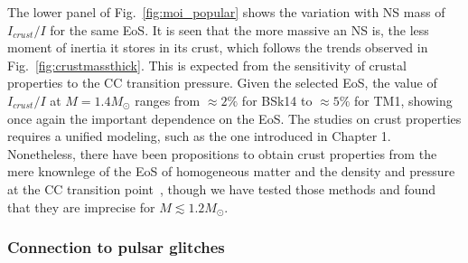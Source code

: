 The lower panel of Fig.~\ref{fig:moi_popular} shows the variation with NS mass
of $I_{crust}/I$ for the same EoS. It is seen that the more massive an 
NS is, the less moment of inertia it stores in its crust, which follows
the trends observed in Fig.~\ref{fig:crustmassthick}. This is expected from 
the sensitivity of crustal properties to the CC transition pressure. Given the 
selected EoS, the value of $I_{crust}/I$ at $M=1.4M_\odot$ 
ranges from $\approx 2\%$ for BSk14 to $\approx 5\%$ for TM1, showing once 
again the important dependence on the EoS. 
{The studies on crust properties requires a unified modeling, such as
the one introduced in Chapter 1. Nonetheless, there have been propositions to
obtain crust properties from the mere knownlege of the EoS of homogeneous 
matter and the density and pressure at the CC transition 
point~\cite{Zdunik2017}, though we have tested those methods and found that 
they are imprecise for $M \lesssim 1.2M_\odot.$}

\subsubsection{Connection to pulsar glitches}\label{subsubsec:glitch}


